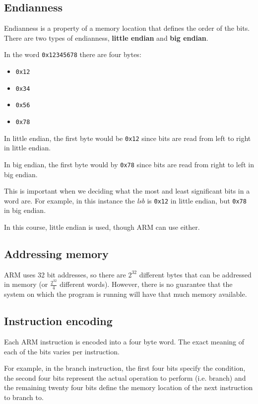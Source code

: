 \documentclass{article}
\begin{document}
\subsection{Endianness}

Endianness is a property of a memory location that defines the order of the bits. There are two types of endianness, {\bf little endian} and {\bf big endian}.

In the word {\tt 0x12345678} there are four bytes:
\begin{itemize}
	\item {\tt 0x12}
	\item {\tt 0x34}
	\item {\tt 0x56}
	\item {\tt 0x78}
\end{itemize}

In little endian, the first byte would be {\tt 0x12} since bits are read from left to right in little endian.

In big endian, the first byte would by {\tt 0x78} since bits are read from right to left in big endian.

This is important when we deciding what the most and least significant bits in a word are. For example, in this instance the {\it lsb} is {\tt 0x12} in little endian, but {\tt 0x78} in big endian.

In this course, little endian is used, though ARM can use either.

\subsection{Addressing memory}

ARM uses 32 bit addresses, so there are $2^{32}$ different bytes that can be addressed in memory (or $\frac{2^{32}}{4}$ different words). However, there is no guarantee that the system on which the program is running will have that much memory available.

\subsection{Instruction encoding}

Each ARM instruction is encoded into a four byte word. The exact meaning of each of the bits varies per instruction.

For example, in the branch instruction, the first four bits specify the condition, the second four bits represent the actual operation to perform (i.e. branch) and the remaining twenty four bits define the memory location of the next instruction to branch to.
\end{document}
